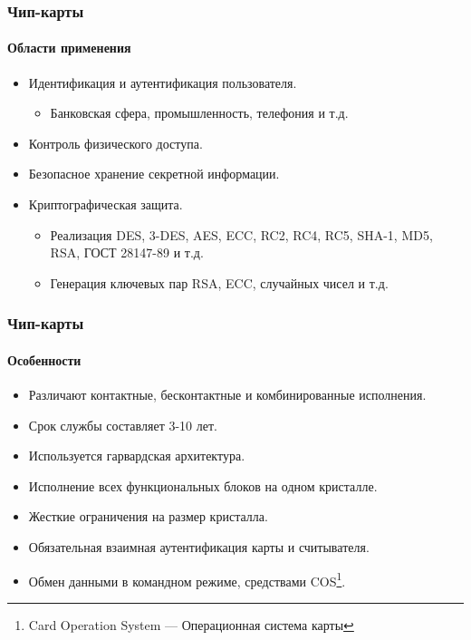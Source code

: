 \begin{frame}
    \frametitle{Чип-карты}
    \framesubtitle{Области применения}
    
    \begin{itemize}
        \item Идентификация и аутентификация пользователя.
        \begin{itemize}
            \item Банковская сфера, промышленность, телефония и т.д.
        \end{itemize}
        
        \item Контроль физического доступа.
        \item Безопасное хранение секретной информации.
        \item Криптографическая защита.
        \begin{itemize}
            \item Реализация DES, 3-DES, AES, ECC, RC2, RC4, RC5, SHA-1, MD5, RSA, ГОСТ 28147-89 и т.д.
            \item Генерация ключевых пар RSA, ECC, случайных чисел и т.д.
        \end{itemize} 
        
    \end{itemize} 
\end{frame}


\begin{frame}
    \frametitle{Чип-карты}
    \framesubtitle{Особенности}
    
    \begin{itemize}
        \item Различают контактные, бесконтактные и комбинированные исполнения.
        \item Срок службы составляет 3-10 лет.
        \item Используется гарвардская архитектура.
        \item Исполнение всех функциональных блоков на одном кристалле.
        \item Жесткие ограничения на размер кристалла.
        \item Обязательная взаимная аутентификация карты и считывателя.
        \item Обмен данными в командном режиме, средствами COS\footnote{Card Operation System --- Операционная система карты}.
    \end{itemize}
\end{frame}


